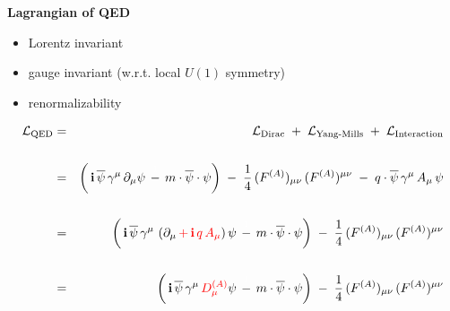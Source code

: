 
\begin{frame}{\headingColor\bf\Large Lagrangian of QED}

\vskip 0.5cm
\scriptsize
\begin{itemize}
\item
	Lorentz invariant
\item
	gauge invariant (w.r.t. local $U(1)$ symmetry)
\item
	renormalizability
\end{itemize}
\large
\begin{eqnarray*}
\mathcal{L}_{\textnormal{QED}}
& = &
	\mathcal{L}_{\textnormal{Dirac}}
	\;+\;
	\mathcal{L}_{\textnormal{Yang-Mills}}
	\;+\;
	\mathcal{L}_{\textnormal{Interaction}}
\\ \\
& = &
	\left(\,
		\i\,\overline{\psi}\,\gamma^{\mu}\,\partial_{\mu}\psi
		\,\overset{{\color{white}1}}{-}\,
		m\cdot\overline{\psi}\cdot\psi
		\right)
	\;-\;
	\dfrac{1}{4}\,(F^{(A)})_{\mu\nu}\,(F^{(A)})^{\mu\nu}
	\;-\;
	q\cdot\overline{\psi}\,\gamma^{\mu}\,A_{\mu}\,\psi
\\ \\
& = &
	\left(\,
		\i\,\overline{\psi}\,\gamma^{\mu}\,
		\left(\partial_{\mu} {\color{red} \,+\, \i\,q\,A_{\mu}}\right)
		\psi
		\,\overset{{\color{white}1}}{-}\,
		m\cdot\overline{\psi}\cdot\psi
		\right)
	\;-\;
	\dfrac{1}{4}\,(F^{(A)})_{\mu\nu}\,(F^{(A)})^{\mu\nu}
\\ \\
& = &
	\left(\,
		\i\,\overline{\psi}\,\gamma^{\mu}\,{\color{red}D^{(A)}_{\mu}}\psi
		\,\overset{{\color{white}1}}{-}\,
		m\cdot\overline{\psi}\cdot\psi
		\right)
	\;-\;
	\dfrac{1}{4}\,(F^{(A)})_{\mu\nu}\,(F^{(A)})^{\mu\nu}
\end{eqnarray*}

\end{frame}
\normalsize

